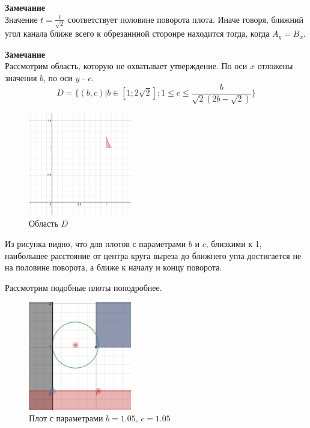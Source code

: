 \textbf{Замечание}\\
Значение $t=\frac{1}{\sqrt{2}}$ соответствует половине поворота плота. Иначе говоря, ближний угол канала ближе всего к обрезаннной сторонре находится тогда, когда $A_y=B_x$.

\textbf{Замечание}\\
Рассмотрим область, которую не охватывает утверждение. По оси $x$ отложены значения $b$, по оси $y$ - $c$.
\begin{equation}
D=\{(b,c) | b \in [1;2\sqrt{2}]; 1 \leq c \leq \frac{b}{\sqrt{2}(2b-\sqrt{2})}\}
\end{equation}

\begin{figure}[!htb]
    \centering
    \includegraphics[width=0.4\textwidth]{fig/exception.png}
    \caption{Область $D$}
\end{figure}

Из рисунка видно, что для плотов с параметрами $b$ и $c$, близкими к 1, наибольшее расстояние от центра круга выреза до ближнего угла достигается не на половине поворота, а ближе к началу и концу поворота.\\

\newpage

Рассмотрим подобные плоты поподробнее. \\

\begin{figure}[!htb]
    \centering
    \includegraphics[width=0.4\textwidth]{fig/special.png}
    \caption{Плот с параметрами $b=1.05$, $c=1.05$}
\end{figure}

